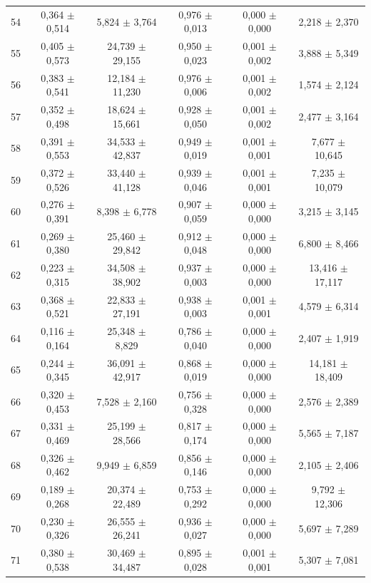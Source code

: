\begin{tabular}{l c c c c c}
54 & 0,364 $\pm$ 0,514 & 5,824 $\pm$ 3,764 & 0,976 $\pm$ 0,013 & 0,000 $\pm$ 0,000 & 2,218 $\pm$ 2,370 \\
55 & 0,405 $\pm$ 0,573 & 24,739 $\pm$ 29,155 & 0,950 $\pm$ 0,023 & 0,001 $\pm$ 0,002 & 3,888 $\pm$ 5,349 \\
56 & 0,383 $\pm$ 0,541 & 12,184 $\pm$ 11,230 & 0,976 $\pm$ 0,006 & 0,001 $\pm$ 0,002 & 1,574 $\pm$ 2,124 \\
57 & 0,352 $\pm$ 0,498 & 18,624 $\pm$ 15,661 & 0,928 $\pm$ 0,050 & 0,001 $\pm$ 0,002 & 2,477 $\pm$ 3,164 \\
58 & 0,391 $\pm$ 0,553 & 34,533 $\pm$ 42,837 & 0,949 $\pm$ 0,019 & 0,001 $\pm$ 0,001 & 7,677 $\pm$ 10,645 \\
59 & 0,372 $\pm$ 0,526 & 33,440 $\pm$ 41,128 & 0,939 $\pm$ 0,046 & 0,001 $\pm$ 0,001 & 7,235 $\pm$ 10,079 \\
60 & 0,276 $\pm$ 0,391 & 8,398 $\pm$ 6,778 & 0,907 $\pm$ 0,059 & 0,000 $\pm$ 0,000 & 3,215 $\pm$ 3,145 \\
61 & 0,269 $\pm$ 0,380 & 25,460 $\pm$ 29,842 & 0,912 $\pm$ 0,048 & 0,000 $\pm$ 0,000 & 6,800 $\pm$ 8,466 \\
62 & 0,223 $\pm$ 0,315 & 34,508 $\pm$ 38,902 & 0,937 $\pm$ 0,003 & 0,000 $\pm$ 0,000 & 13,416 $\pm$ 17,117 \\
63 & 0,368 $\pm$ 0,521 & 22,833 $\pm$ 27,191 & 0,938 $\pm$ 0,003 & 0,001 $\pm$ 0,001 & 4,579 $\pm$ 6,314 \\
64 & 0,116 $\pm$ 0,164 & 25,348 $\pm$ 8,829 & 0,786 $\pm$ 0,040 & 0,000 $\pm$ 0,000 & 2,407 $\pm$ 1,919 \\
65 & 0,244 $\pm$ 0,345 & 36,091 $\pm$ 42,917 & 0,868 $\pm$ 0,019 & 0,000 $\pm$ 0,000 & 14,181 $\pm$ 18,409 \\
66 & 0,320 $\pm$ 0,453 & 7,528 $\pm$ 2,160 & 0,756 $\pm$ 0,328 & 0,000 $\pm$ 0,000 & 2,576 $\pm$ 2,389 \\
67 & 0,331 $\pm$ 0,469 & 25,199 $\pm$ 28,566 & 0,817 $\pm$ 0,174 & 0,000 $\pm$ 0,000 & 5,565 $\pm$ 7,187 \\
68 & 0,326 $\pm$ 0,462 & 9,949 $\pm$ 6,859 & 0,856 $\pm$ 0,146 & 0,000 $\pm$ 0,000 & 2,105 $\pm$ 2,406 \\
69 & 0,189 $\pm$ 0,268 & 20,374 $\pm$ 22,489 & 0,753 $\pm$ 0,292 & 0,000 $\pm$ 0,000 & 9,792 $\pm$ 12,306 \\
70 & 0,230 $\pm$ 0,326 & 26,555 $\pm$ 26,241 & 0,936 $\pm$ 0,027 & 0,000 $\pm$ 0,000 & 5,697 $\pm$ 7,289 \\
71 & 0,380 $\pm$ 0,538 & 30,469 $\pm$ 34,487 & 0,895 $\pm$ 0,028 & 0,001 $\pm$ 0,001 & 5,307 $\pm$ 7,081 \\

\end{tabular}
